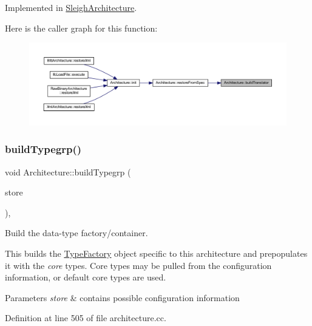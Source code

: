 Implemented in \mbox{\hyperlink{class_sleigh_architecture_aae195ea2828d13b6e15d16c722d14b18}{Sleigh\+Architecture}}.

Here is the caller graph for this function\+:
\nopagebreak
\begin{figure}[H]
\begin{center}
\leavevmode
\includegraphics[width=350pt]{class_architecture_ab951056481cac3e73770db9d567d5212_icgraph}
\end{center}
\end{figure}
\mbox{\label{class_architecture_aaf041374ee649d2c0d8e95e450af5bf9}} 
\subsubsection{\texorpdfstring{buildTypegrp()}{buildTypegrp()}}
{\footnotesize\ttfamily void Architecture\+::build\+Typegrp (\begin{DoxyParamCaption}\item[{\mbox{\hyperlink{class_document_storage}{Document\+Storage}} \&}]{store }\end{DoxyParamCaption})\hspace{0.3cm}{\ttfamily [protected]}, {\ttfamily [virtual]}}



Build the data-\/type factory/container. 

This builds the \mbox{\hyperlink{class_type_factory}{Type\+Factory}} object specific to this architecture and prepopulates it with the {\itshape core} types. Core types may be pulled from the configuration information, or default core types are used. 
\begin{DoxyParams}{Parameters}
{\em store} & contains possible configuration information \\
\hline
\end{DoxyParams}


Definition at line 505 of file architecture.\+cc.

